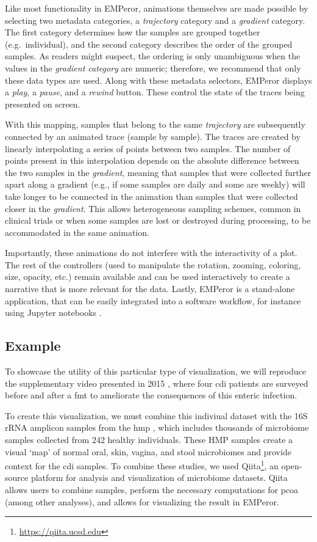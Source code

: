 Like most functionality in EMPeror, animations themselves are made possible by selecting two metadata categories, a \textit{trajectory} category and a \textit{gradient} category. The first category determines how the samples are grouped together (e.g.\ individual), and the second category describes the order of the grouped samples. As readers might suspect, the ordering is only unambiguous when the values in the \textit{gradient category} are numeric; therefore, we recommend that only these data types are used. Along with these metadata selectors, EMPeror displays a \textit{play}, a \textit{pause}, and a \textit{rewind} button. These control the state of the traces being presented on screen.

With this mapping, samples that belong to the same \textit{trajectory} are subsequently connected by an animated trace (sample by sample). The traces are created by linearly interpolating a series of points between two samples. The number of points present in this interpolation depends on the absolute difference between the two samples in the \textit{gradient}, meaning that samples that were collected further apart along a gradient (e.g., if some samples are daily and some are weekly) will take longer to be connected in the animation than samples that were collected closer in the \textit{gradient}. This allows heterogeneous sampling schemes, common in clinical trials or when some samples are lost or destroyed during processing, to be accommodated in the same animation.

Importantly, these animations do not interfere with the interactivity of a plot. The rest of the controllers (used to manipulate the rotation, zooming, coloring, size, opacity, etc.) remain available and can be used interactively to create a narrative that is more relevant for the data. Lastly, EMPeror is a stand-alone application, that can be easily integrated into a software workflow, for instance using Jupyter notebooks \cite{RN162}.

\subsection{Example}
To showcase the utility of this particular type of visualization, we will reproduce the supplementary video presented in 2015 \cite{RN4026}, where four \gls{cdi} patients are surveyed before and after a \gls{fmt} to ameliorate the consequences of this enteric infection.

To create  this visualization, we must combine this indiviual dataset with the 16S rRNA amplicon samples from the \gls{hmp} \cite{RN3752}, which includes thousands of microbiome samples collected from 242 healthy individuals. These HMP samples create a visual `map' of normal oral, skin, vagina, and stool microbiomes and provide context for the \gls{cdi} samples. To combine these studies, we used  Qiita\footnote{\url{https://qiita.ucsd.edu}}, an open-source platform for analysis and visualization of microbiome datasets. Qiita allows users to combine samples, perform the necessary computations for \gls{pcoa} (among other analyses), and allows for visualizing the result in EMPeror. 


